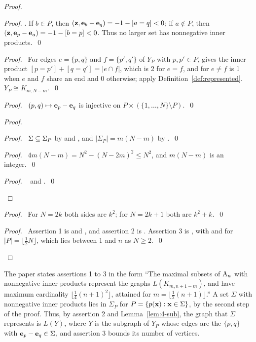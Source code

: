 \begin{proof}
\begin{proof}
  . If $b\in P$, then $({\mathbf z},{\mathbf e}_b-{\mathbf e}_q)=-1-[a=q]<0$; if $a\notin P$, then
  $({\mathbf z},{\mathbf e}_p-{\mathbf e}_a)=-1-[b=p]<0$. Thus no larger set has nonnegative inner
  products.~\qed\end{proof}
 \begin{proof}\pf\ For edges $e=\{p,q\}$ and $f=\{p',q'\}$ of $Y_P$ with $p,p'\in P$,
   gives the inner product $[p=p']+[q=q']=|e\cap f|$, which is 2 for $e=f$, and
  for $e\ne f$ is 1 when $e$ and $f$ share an end and 0 otherwise; apply
  Definition~\ref{def:represented}. $Y_P\cong K_{m,N-m}$.~\qed\end{proof}
 \begin{proof}\pf\ $(p,q)\mapsto{\mathbf e}_p-{\mathbf e}_q$ is injective on $P\times(\{1,\dots,N\}\setminus
  P)$.~\qed\end{proof}
 \begin{proof}
  \begin{proof}\pf\ $\Sigma\subseteq\Sigma_P$ by  and , and
   $|\Sigma_P|=m(N-m)$ by .~\qed\end{proof}
  \begin{proof}\pf\ $4m(N-m)=N^2-(N-2m)^2\le N^2$, and $m(N-m)$ is an
   integer.~\qed\end{proof}
  \qedstep
  \begin{proof}\pf\  and .~\qed\end{proof}
 \end{proof}
 \begin{proof}\pf\ For $N=2k$ both sides are $k^2$; for $N=2k+1$ both are
  $k^2+k$.~\qed\end{proof}
 \qedstep
 \begin{proof}\pf\ Assertion 1 is  and , and assertion 2 is
  . Assertion 3 is , with  and
   for $|P|=\lfloor\frac12N\rfloor$, which lies between 1 and $n$ as
  $N\ge2$.~\qed\end{proof}
\end{proof}
The paper states assertions 1 to 3 in the form ``The maximal subsets of $\mathrm{A}_n$ with
nonnegative inner products represent the graphs $L(K_{m,n+1-m})$, and have maximum cardinality
$\lfloor\frac14(n+1)^2\rfloor$, attained for $m=\lfloor\frac12(n+1)\rfloor$.'' A set
$\Sigma$ with nonnegative inner products lies in $\Sigma_P$ for $P=\{p({\mathbf x}):{\mathbf x}\in\Sigma\}$, by
the second step of the proof. Thus, by assertion 2 and Lemma~\ref{lem:4-sub}, the graph that
$\Sigma$ represents is $L(Y)$, where $Y$ is the subgraph of $Y_P$ whose edges are the
$\{p,q\}$ with ${\mathbf e}_p-{\mathbf e}_q\in\Sigma$, and assertion 3 bounds its number of vertices.

